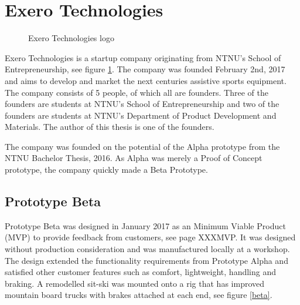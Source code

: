 \section{Exero Technologies}

\setlength\intextsep{0pt}
\begin{figure}
    \begin{center}
    {\setlength{\fboxsep}{0pt}\setlength{\fboxrule}{0.5pt}
    }
    \caption{Exero Technologies logo}
    \label{exero}    
    \end{center}
\end{figure}

Exero Technologies is a startup company originating from NTNU's School of Entrepreneurship, see figure \ref{exero}. The company was founded February 2nd, 2017 and aims to develop and market the next centuries assistive sports equipment. The company consists of 5 people, of which all are founders. Three of the founders are students at NTNU's School of Entrepreneurship and two of the founders are students at NTNU's Department of Product Development and Materials. The author of this thesis is one of the founders.
\par
The company was founded on the potential of the Alpha prototype from the NTNU Bachelor Thesis, 2016. As Alpha was merely a Proof of Concept prototype, the company quickly made a Beta Prototype.   
\par 

\subsection{Prototype Beta}
Prototype Beta was designed in January 2017 as an Minimum Viable Product (MVP) to provide feedback from customers, see page XXXMVP. It was designed without production consideration and was manufactured locally at a workshop. The design extended the functionality requirements from Prototype Alpha and satisfied other customer features such as comfort, lightweight, handling and braking. A remodelled sit-ski was mounted onto a rig that has improved mountain board trucks with brakes attached at each end, see figure \ref{beta}. 

